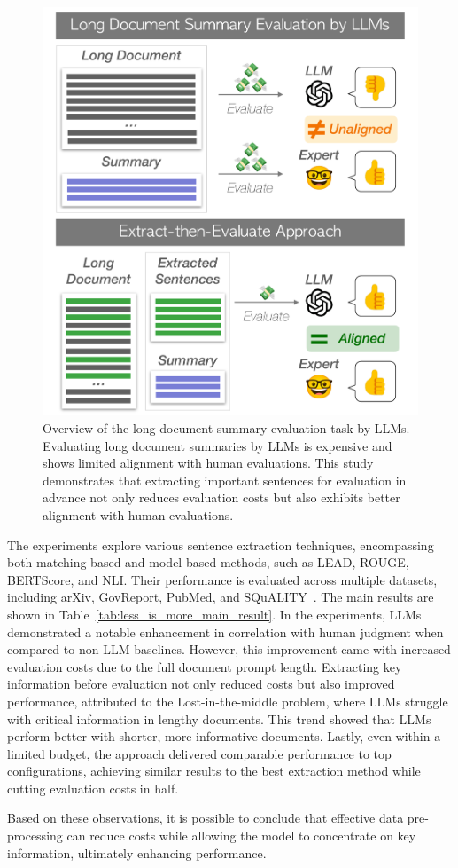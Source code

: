 \begin{figure}[!t]
  \centering
  \includegraphics[width=0.5\linewidth]{submissions/Estevam2024/figures/less_is_more.pdf}
  \caption{Overview of the long document summary evaluation task by LLMs. Evaluating long document summaries by LLMs is expensive and shows limited alignment with human evaluations. This study demonstrates that extracting important sentences for evaluation in advance not only reduces evaluation costs but also exhibits better alignment with human evaluations.}
  \label{fig:less_is_more}
\end{figure}

The experiments explore various sentence extraction techniques, encompassing both matching-based and model-based methods, such as LEAD, ROUGE, BERTScore, and NLI. Their performance is evaluated across multiple datasets, including arXiv, GovReport, PubMed, and SQuALITY~\cite{koh-etal-2022-far,krishna-etal-2023-longeval}. The main results are shown in Table~\ref{tab:less_is_more_main_result}. In the experiments, LLMs demonstrated a notable enhancement in correlation with human judgment when compared to non-LLM baselines. However, this improvement came with increased evaluation costs due to the full document prompt length. Extracting key information before evaluation not only reduced costs but also improved performance, attributed to the Lost-in-the-middle problem, where LLMs struggle with critical information in lengthy documents. This trend showed that LLMs perform better with shorter, more informative documents. Lastly, even within a limited budget, the approach delivered comparable performance to top configurations, achieving similar results to the best extraction method while cutting evaluation costs in half.

Based on these observations, it is possible to conclude that effective data pre-processing can reduce costs while allowing the model to concentrate on key information, ultimately enhancing performance.

